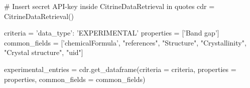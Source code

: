 # Insert secret API-key inside CitrineDataRetrieval in quotes
cdr = CitrineDataRetrieval()

criteria = {'data_type': 'EXPERIMENTAL'}
properties = ['Band gap']
common_fields = ['chemicalFormula', "references", "Structure", "Crystallinity", "Crystal structure", "uid"]

experimental_entries = cdr.get_dataframe(criteria = criteria,
                     properties = properties,
                     common_fields = common_fields)
